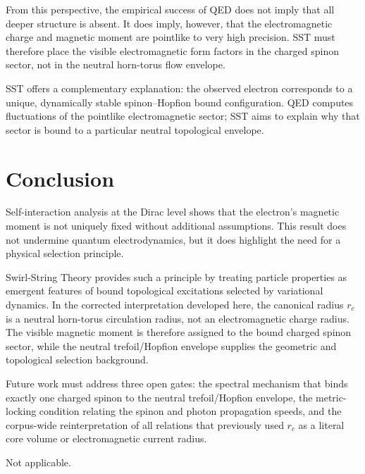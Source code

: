 \documentclass[pdflatex,sn-mathphys-num]{sn-jnl}
\theoremstyle{thmstyleone}
\theoremstyle{thmstyletwo}
\theoremstyle{thmstylethree}
\newcommand{\rc}{r_c}
\begin{document}
        From this perspective, the empirical success of QED does not imply that all deeper structure is absent. It does imply, however, that the electromagnetic charge and magnetic moment are pointlike to very high precision. SST must therefore place the visible electromagnetic form factors in the charged spinon sector, not in the neutral horn-torus flow envelope.

        SST offers a complementary explanation: the observed electron corresponds to a unique, dynamically stable spinon--Hopfion bound configuration. QED computes fluctuations of the pointlike electromagnetic sector; SST aims to explain why that sector is bound to a particular neutral topological envelope.

    \section{Conclusion}
        \label{sec:conclusion}

        Self-interaction analysis at the Dirac level shows that the electron’s magnetic moment is not uniquely fixed without additional assumptions. This result does not undermine quantum electrodynamics, but it does highlight the need for a physical selection principle.

        Swirl-String Theory provides such a principle by treating particle properties as emergent features of bound topological excitations selected by variational dynamics. In the corrected interpretation developed here, the canonical radius $\rc$ is a neutral horn-torus circulation radius, not an electromagnetic charge radius. The visible magnetic moment is therefore assigned to the bound charged spinon sector, while the neutral trefoil/Hopfion envelope supplies the geometric and topological selection background.

        Future work must address three open gates: the spectral mechanism that binds exactly one charged spinon to the neutral trefoil/Hopfion envelope, the metric-locking condition relating the spinon and photon propagation speeds, and the corpus-wide reinterpretation of all relations that previously used $\rc$ as a literal core volume or electromagnetic current radius.

        \backmatter

        Not applicable.
\end{document}
